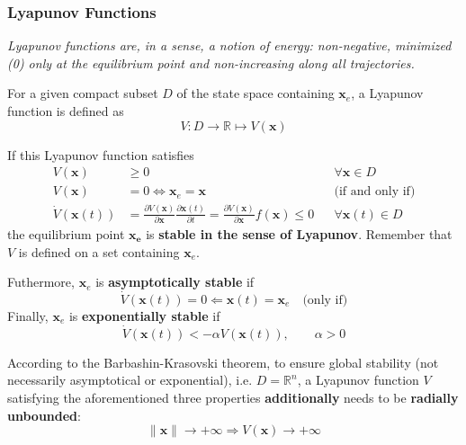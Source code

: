 \subsubsection{Lyapunov Functions}
\textit{Lyapunov functions are, in a sense, a notion of energy: non-negative, minimized (0) only at the equilibrium point and non-increasing along all trajectories.}

\newpar{}
For a given compact subset $D$ of the state space containing $\mathbf{x}_e$, a Lyapunov function is defined as
\noindent\begin{equation*}
    V:D \to \mathbb{R} \mapsto V(\mathbf{x})
\end{equation*}

If this Lyapunov function satisfies
\noindent\begin{align*}
    V(\mathbf{x})          & \geq 0                                                                                                                                                                   &  & \forall \mathbf{x}\in D    \\
    V(\mathbf{x})          & = 0 \Leftrightarrow \mathbf{x}_e = \mathbf{x}                                                                                                                            &  & \text{(if and only if)}    \\
    \dot{V}(\mathbf{x}(t)) & = \frac{\partial V(\mathbf{x})}{\partial \mathbf{x}} \frac{\partial \mathbf{x}(t)}{\partial t} = \frac{\partial V(\mathbf{x})}{\partial \mathbf{x}} f(\mathbf{x}) \leq 0 &  & \forall \mathbf{x}(t)\in D
\end{align*}
the equilibrium point $\mathbf{x_e}$ is \textbf{stable in the sense of Lyapunov}. Remember that $V$ is defined on a set containing $\mathbf{x}_e$.

\newpar{}
Futhermore, $\mathbf{x}_e$ is \textbf{asymptotically stable} if
\noindent\begin{equation*}
    \dot{V}(\mathbf{x}(t)) = 0 \Leftarrow \mathbf{x}(t) = \mathbf{x}_e \quad \text{(only if)}
\end{equation*}
Finally, $\mathbf{x}_e$ is \textbf{exponentially stable} if
\noindent\begin{equation*}
    \dot{V}(\mathbf{x}(t)) < -\alpha V(\mathbf{x}(t)), \qquad \alpha>0
\end{equation*}

\newpar{}

According to the Barbashin-Krasovski theorem, to ensure global stability (not necessarily asymptotical or exponential), i.e. $D=\mathbb{R}^n$, a Lyapunov function $V$ satisfying the aforementioned three properties \textbf{additionally} needs to be \textbf{radially unbounded}:
\noindent\begin{equation*}
    \|\mathbf{x}\| \to +\infty \Rightarrow V(\mathbf{x}) \to +\infty
\end{equation*}

